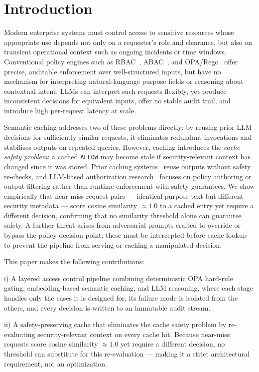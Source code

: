 \documentclass[runningheads]{llncs}
\begin{document}
%
%
\section{Introduction}

Modern enterprise systems must control access to sensitive resources whose appropriate use depends not only on a requester's role and clearance, but also on transient operational context such as ongoing incidents or time windows. Conventional policy engines such as RBAC~\cite{sandhu1996rbac}, ABAC~\cite{xacml2013}, and OPA/Rego~\cite{opa} offer precise, auditable enforcement over well-structured inputs, but have no mechanism for interpreting natural-language purpose fields or reasoning about contextual intent. LLMs can interpret such requests flexibly, yet produce inconsistent decisions for equivalent inputs, offer no stable audit trail, and introduce high per-request latency at scale.

Semantic caching addresses two of these problems directly: by reusing prior LLM decisions for sufficiently similar requests, it eliminates redundant invocations and stabilises outputs on repeated queries. However, caching introduces the \emph{cache safety problem}: a cached \texttt{ALLOW} may become stale if security-relevant context has changed since it was stored. Prior caching systems~\cite{bang2023gptcache,schroeder2025vcache} reuse outputs without safety re-checks, and LLM-based authorization research~\cite{coletti2024sacmat,permllm2025} focuses on policy authoring or output filtering rather than runtime enforcement with safety guarantees. We show empirically that near-miss request pairs --- identical purpose text but different security metadata --- score cosine similarity $\approx 1.0$ to a cached entry yet require a different decision, confirming that no similarity threshold alone can guarantee safety. A further threat arises from adversarial prompts crafted to override or bypass the policy decision point; these must be intercepted before cache lookup to prevent the pipeline from serving or caching a manipulated decision.

This paper makes the following contributions:

i) A layered access control pipeline combining deterministic OPA hard-rule gating, embedding-based semantic caching, and LLM reasoning, where each stage handles only the cases it is designed for, its failure mode is isolated from the others, and every decision is written to an immutable audit stream.

ii) A safety-preserving cache that eliminates the cache safety problem by re-evaluating security-relevant context on every cache hit. Because near-miss requests score cosine similarity $\approx 1.0$ yet require a different decision, no threshold can substitute for this re-evaluation --- making it a strict architectural requirement, not an optimization.
\end{document}
